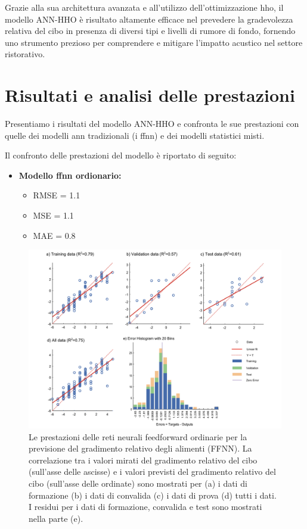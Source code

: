 Grazie alla sua architettura avanzata e all'utilizzo dell'ottimizzazione \gls{hho}, il modello ANN-HHO è risultato altamente efficace nel prevedere la gradevolezza relativa del cibo in presenza di diversi tipi e livelli di rumore di fondo, fornendo uno strumento prezioso per comprendere e mitigare l'impatto acustico nel settore ristorativo.

\section{Risultati e analisi delle prestazioni}
\noindent

Presentiamo i risultati del modello ANN-HHO e confronta le sue prestazioni con quelle dei modelli \gls{ann} tradizionali (i \gls{ffnn}) e dei modelli statistici misti.

Il confronto delle prestazioni del modello è riportato di seguito:

\newpage 
\begin{itemize}

      \item \textbf{Modello \gls{ffnn} ordionario:}
            \begin{itemize}
                  \item RMSE = 1.1
                  \item MSE = 1.1
                   \item MAE = 0.8
            \end{itemize}       
\end{itemize}

\begin{figure}[H]
      \captionsetup{font=scriptsize}
      \centering
      \includegraphics[width=1\textwidth]{Chapters/Figures/ffnn-result.png} 
      \caption{\small Le prestazioni delle reti neurali feedforward ordinarie per la previsione del gradimento relativo degli alimenti (FFNN). La correlazione tra i valori mirati del gradimento relativo del cibo (sull'asse delle ascisse) e i valori previsti del gradimento relativo del cibo (sull'asse delle ordinate) sono mostrati per (a) i dati di formazione (b) i dati di convalida (c) i dati di prova (d) tutti i dati. I residui per i dati di formazione, convalida e test sono mostrati nella parte (e).}
      \label{fig:ffnn-abc}
\end{figure}

